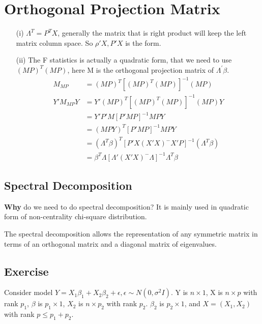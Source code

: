 
 \section{Orthogonal Projection Matrix}
 
\begin{itemize}

\item[(i)] $\Lambda^{T}  = P^T X$, generally the matrix that is right product will keep the left matrix column space. So $\rho' X, P' X$ is the form.

\item[(ii)] The F statistics is actually a quadratic form, that we need to use $(MP)^T(MP)$, here M is the orthogonal projection matrix of $\Lambda^{'} \beta$. 
\begin{align*}
	M_{MP}&= (MP)^{T} [(MP)^T (MP)]^{-1} (MP) \\
	Y' M_{MP} Y &= Y'  (MP)^{T} [(MP)^T (MP)]^{-1} (MP) Y \\
	&= Y'P' M [P'MP]^{-1} MPY \\
	&= (MPY)^{T} [P'MP]^{-1} MPY \\
	&= (\Lambda^T \beta)^T [P' X (X'X)^{-} X' P]^{-1} (\Lambda^T \beta) \\
	&= \beta^T \Lambda [\Lambda' (X'X)^{-} \Lambda]^{-1} \Lambda^T \beta
\end{align*} 

\end{itemize}


 \subsection{Spectral Decomposition}
 
 \textbf{Why} do we need to do spectral decomposition? It is mainly used in quadratic form of non-centrality chi-square distribution.
 
 \begin{definition}
 The spectral decomposition allows the representation of any symmetric matrix in terms of an orthogonal matrix and a diagonal matrix of eigenvalues.
 \end{definition}
 
 \clearpage
 
\subsection{Exercise}

Consider model $Y = X_1 \beta_1 + X_2 \beta_2 + \epsilon, \epsilon \sim N(0, \sigma^2 I)$. Y is $n \times 1$, X is $n \times p$ with rank $p_1$, $\beta$ is $p_1 \times 1$, $X_2$ is $n \times p_2$ with rank $p_2$. 
$\beta_2$ is $p_2 \times 1$, and $X= (X_1, X_2)$ with rank $p \leq p_1 + p_2$.

